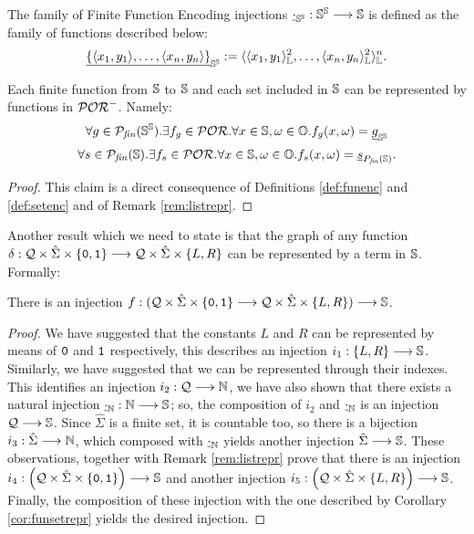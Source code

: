 \begin{defn}
  \label{def:funenc}
The family of Finite Function Encoding injections
${\underline{\cdot}}_{\mathbb{S}^{\mathbb{S}}}: \mathbb{S}^{\mathbb{S}} \longrightarrow \mathbb{S}$
is defined as the family of functions described below:
$$
{\underline{\{\langle x_1, y_1\rangle,\ldots, \langle x_n, y_n\rangle\}}}_{\mathbb{S}^{\mathbb{S}}}
:= \langle{\langle{x_1, y_1}\rangle^{2}_{\mathbb{L}},\ldots, \langle{x_n, y_n}\rangle^{2}_{\mathbb{L}}}\rangle^{n}_{\mathbb{L}}.
$$
\end{defn}

\begin{cor}
  \label{cor:funsetrepr}
  Each finite function from $\mathbb{S}$ to $\mathbb{S}$ and each set included in $\mathbb{S}$ can
  be represented by functions in $\mathcal{POR}^-$. Namely:
  \[
  \forall g \in \mathcal P_\mathit{fin}(\mathbb{S}^{\mathbb{S}}).
  \exists f_g \in \mathcal{POR}. \forall x \in \mathbb{S}, \omega \in \mathbb{O}.
   f_g(x, \omega) = {\underline{g}}_{\mathbb{S}^{\mathbb{S}}}
  \]
  \[
  \forall s \in \mathcal P_\mathit{fin}(\mathbb{S}).
  \exists f_s \in \mathcal{POR}. \forall x \in \mathbb{S}, \omega \in \mathbb{O}.
   f_s(x, \omega) = {\underline{s}}_{P_\mathit{fin}(\mathbb{S})}.
  \]
\end{cor}
\begin{proof}
  This claim is a direct consequence of Definitions \ref{def:funenc} and \ref{def:setenc}
  and of Remark \ref{rem:listrepr}.
\end{proof}

Another result which we need to state is that the graph of any function
$\delta:\mathcal{Q} \times {\hat \Sigma} \times
\{\mathtt{0}, \mathtt{1}\} \longrightarrow \mathcal{Q}
\times {\hat \Sigma} \times \{L,R\}$
can be represented by a term in $\mathbb{S}$. Formally:

\begin{cor}
  \label{cor:deltarepr}
  There is an injection $f: (\mathcal{Q} \times {\hat \Sigma} \times
  \{\mathtt{0}, \mathtt{1}\} \longrightarrow \mathcal{Q}
  \times {\hat \Sigma} \times \{L,R\}) \longrightarrow \mathbb{S}$.
\end{cor}
\begin{proof}
  We have suggested that the constants $L$ and $R$ can be represented by means of
  $\mathtt{0}$ and $\mathtt{1}$ respectively, this describes an injection
  $i_1:\{L, R\} \longrightarrow \mathbb{S}$.
  Similarly, we have suggested that we can be represented through their indexes.
  This identifies an injection $i_2: \mathcal{Q} \longrightarrow \mathbb{N}$,
  we have also shown that there exists a natural injection
  ${\underline{\cdot}}_{\mathbb{N}}:\mathbb{N} \longrightarrow \mathbb{S}$; so, the composition of
  $i_2$ and ${\underline{\cdot}}_{\mathbb{N}}$ is an injection $\mathcal{Q}\longrightarrow \mathbb{S}$.
  Since ${\hat \Sigma}$ is a finite set, it is countable too, so there is a bijection
  $i_3: {\hat \Sigma} \longrightarrow \mathbb{N}$, which composed with ${\underline{\cdot}}_{\mathbb{N}}$
  yields another injection ${\hat \Sigma} \longrightarrow \mathbb{S}$.
  These observations, together with Remark \ref{rem:listrepr} prove that
  there is an injection
  $i_4:\left(\mathcal{Q} \times {\hat \Sigma} \times \{\mathtt{0}, \mathtt{1}\}\right) \longrightarrow \mathbb{S}$
  and another injection
  $i_5:\left(\mathcal{Q} \times {\hat \Sigma} \times \{L, R\}\right) \longrightarrow \mathbb{S}$.
  Finally, the composition of these injection with the one described by
  Corollary \ref{cor:funsetrepr} yields the desired injection.
\end{proof}


